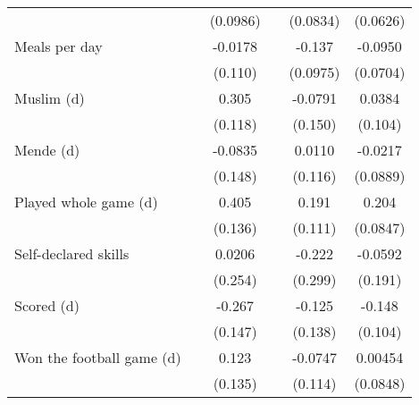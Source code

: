{\begin{tabular}{l*{5}{c}}
                    &                     &    (0.0986)         &                     &    (0.0834)         &    (0.0626)         \\
[1em]
Meals per day       &                     &     -0.0178         &                     &      -0.137         &     -0.0950         \\
                    &                     &     (0.110)         &                     &    (0.0975)         &    (0.0704)         \\
[1em]
Muslim (d)          &                     &       0.305\sym{***}&                     &     -0.0791         &      0.0384         \\
                    &                     &     (0.118)         &                     &     (0.150)         &     (0.104)         \\
[1em]
Mende (d)           &                     &     -0.0835         &                     &      0.0110         &     -0.0217         \\
                    &                     &     (0.148)         &                     &     (0.116)         &    (0.0889)         \\
[1em]
Played whole game (d)&                     &       0.405\sym{***}&                     &       0.191\sym{*}  &       0.204\sym{**} \\
                    &                     &     (0.136)         &                     &     (0.111)         &    (0.0847)         \\
[1em]
Self-declared skills&                     &      0.0206         &                     &      -0.222         &     -0.0592         \\
                    &                     &     (0.254)         &                     &     (0.299)         &     (0.191)         \\
[1em]
Scored (d)          &                     &      -0.267\sym{*}  &                     &      -0.125         &      -0.148         \\
                    &                     &     (0.147)         &                     &     (0.138)         &     (0.104)         \\
[1em]
Won the football game (d)&                     &       0.123         &                     &     -0.0747         &     0.00454         \\
                    &                     &     (0.135)         &                     &     (0.114)         &    (0.0848)         \\

\end{tabular}}
